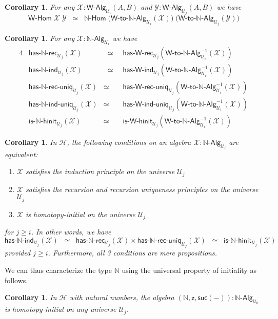 \documentclass[reqno,10pt,a4paper,oneside]{amsart}
\newcommand{\X}{\mathcal{X}}
\newcommand{\Y}{\mathcal{Y}}
\newcommand{\z}{\mathsf{z}}
\newcommand{\suc}{\mathsf{suc}}
\newcommand{\nat}{\ensuremath{\mathbb{N}}}
\newcommand{\W}{\mathsf{W}}
\newcommand{\UU}{\mathcal{U}}
\newcommand{\NatAlg}{\nat\text{-}\mathsf{Alg}}
\newcommand{\NatHom}{\nat\text{-}\mathsf{Hom}}
\newcommand{\HasNatRec}{\mathsf{has}\text{-}\nat\text{-}\mathsf{rec}}
\newcommand{\HasNatInd}{\mathsf{has}\text{-}\nat\text{-}\mathsf{ind}}
\newcommand{\HasNatRecUniq}{\mathsf{has}\text{-}\nat\text{-}\mathsf{rec}\text{-}\mathsf{uniq}}
\newcommand{\HasNatIndUniq}{\mathsf{has}\text{-}\nat\text{-}\mathsf{ind}\text{-}\mathsf{uniq}}
\newcommand{\IsNatHInit}{\mathsf{is}\text{-}\nat\text{-}\mathsf{hinit}}
\newcommand{\WAlgToNatAlg}{\W\text{-}\mathsf{to}\text{-}\nat\text{-}\mathsf{Alg}}
\newcommand{\WAlg}{\mathsf{W}\text{-}\mathsf{Alg}}
\newcommand{\WHom}{\mathsf{W}\text{-}\mathsf{Hom}}
\newcommand{\HasWRec}{\mathsf{has}\text{-}\mathsf{W}\text{-}\mathsf{rec}}
\newcommand{\HasWInd}{\mathsf{has}\text{-}\mathsf{W}\text{-}\mathsf{ind}}
\newcommand{\HasWRecUniq}{\mathsf{has}\text{-}\mathsf{W}\text{-}\mathsf{rec}\text{-}\mathsf{uniq}}
\newcommand{\HasWIndUniq}{\mathsf{has}\text{-}\mathsf{W}\text{-}\mathsf{ind}\text{-}\mathsf{uniq}}
\newcommand{\IsWHInit}{\mathsf{is}\text{-}\mathsf{\W}\text{-}\mathsf{hinit}}
\newcommand{\Hint}{\mathcal{H}}
\numberwithin{equation}{section}
\theoremstyle{mythm}
\newtheorem{corollary}[theorem]{Corollary}
\theoremstyle{mydef}
\theoremstyle{myrmk}
\begin{document}
\begin{corollary}
For any $\X : \WAlg_{\UU_i}(A,B)$ and $\Y : \WAlg_{\UU_j}(A,B)$ we have
\[ \WHom \; \X \; \Y \;\; \simeq \;\; \NatHom \; \big(\WAlgToNatAlg_{\UU_i}(\X)\big) \; \big(\WAlgToNatAlg_{\UU_j}(\Y)\big) \]
\end{corollary}

\begin{corollary}
For any $\X : \NatAlg_{\UU_i}$ we have
\begin{alignat*}{4}
& \HasNatRec_{\UU_j}(\X) & \;\; \simeq \;\; & \HasWRec_{\UU_j}(\WAlgToNatAlg_{\UU_i}^{-1}(\X)) \\
& \HasNatInd_{\UU_j}(\X) & \;\; \simeq \;\; & \HasWInd_{\UU_j}(\WAlgToNatAlg_{\UU_i}^{-1}(\X)) \\
& \HasNatRecUniq_{\UU_j}(\X) &  \simeq \;\; & \HasWRecUniq_{\UU_j}(\WAlgToNatAlg_{\UU_i}^{-1}(\X)) \\
& \HasNatIndUniq_{\UU_j}(\X) & \simeq \;\; &  \HasWIndUniq_{\UU_j}(\WAlgToNatAlg_{\UU_i}^{-1}(\X)) \\
& \IsNatHInit_{\UU_j}(\X) & \simeq \;\; & \IsWHInit_{\UU_j}(\WAlgToNatAlg_{\UU_i}^{-1}(\X))
\end{alignat*}
\end{corollary}

\begin{corollary}\label{lem:NatMainInt}
In $\Hint$, the following conditions on an algebra $\X : \NatAlg_{\UU_i}$ are equivalent:
\begin{enumerate}
\item $\X$ satisfies the induction principle on the universe $\UU_j$
\item $\X$ satisfies the recursion and recursion uniqueness principles on the universe $\UU_j$
\item $\X$ is homotopy-initial on the universe $\UU_j$  
\end{enumerate}
for $j \geq i$. In other words, we have \[ \HasNatInd_{\UU_j}(\X)  \;\; \simeq \;\; \HasNatRec_{\UU_j}(\X) \times \HasNatRecUniq_{\UU_j}(\X) \;\; \simeq \;\; \IsNatHInit_{\UU_j}(\X) \]
provided $j \geq i$. Furthermore, all 3 conditions are mere propositions.
\end{corollary}

We can thus characterize the type $\nat$ using the universal property of initiality as follows.
\begin{corollary}\label{lem:NatInitInt}
In $\Hint$ with natural numbers, the algebra $(\nat,\z,\suc(-)) : \NatAlg_{\UU_0}$ is homotopy-initial on any universe $\UU_j$.
\end{corollary}
\end{document}
